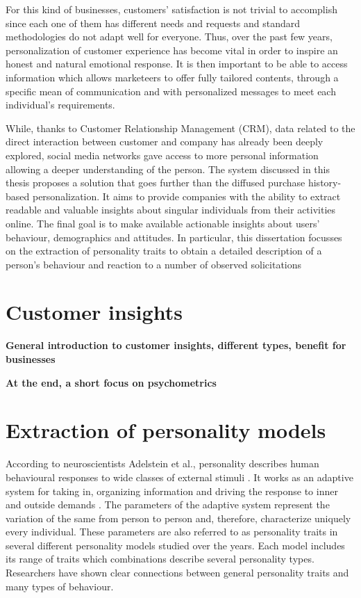For this kind of businesses, customers' satisfaction is not trivial to accomplish since each one of them has different needs and requests and standard methodologies do not adapt well for everyone.
Thus, over the past few years, personalization of customer experience has become vital in order to inspire an honest and natural emotional response.
It is then important to be able to access information which allows marketeers to offer fully tailored contents, through a specific mean of communication and with personalized messages to meet each individual's requirements.

While, thanks to Customer Relationship Management (CRM), data related to the direct interaction between customer and company has already been deeply explored, social media networks gave access to more personal information allowing a deeper understanding of the person.
The system discussed in this thesis proposes a solution that goes further than the diffused purchase history-based personalization.
It aims to provide companies with the ability to extract readable and valuable insights about singular individuals from their activities online.
The final goal is to make available actionable insights about users' behaviour, demographics and attitudes.
In particular, this dissertation focusses on the extraction of personality traits to obtain a detailed description of a person's behaviour and reaction to a number of observed solicitations



\section{Customer insights}
\textbf{General introduction to customer insights, different types, benefit for businesses}

\textbf{At the end, a short focus on psychometrics}

\section{Extraction of personality models}
According to neuroscientists Adelstein et al., personality describes human behavioural responses to wide classes of external stimuli \cite{adelstein2011personality}. It works as an adaptive system for taking in, organizing information and driving the response to inner and outside demands \cite{block2002personality}.
The parameters of the adaptive system represent the variation of the same from person to person and, therefore, characterize uniquely every individual. These parameters are also referred to as personality traits in several different personality models studied over the years.
Each model includes its range of traits which combinations describe several personality types.
Researchers have shown clear connections between general personality traits and many types of behaviour.


